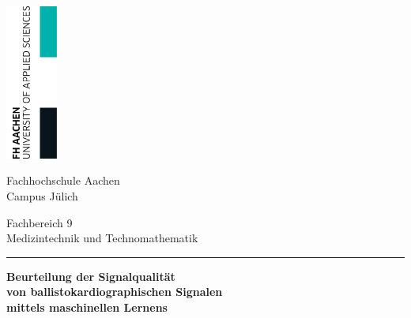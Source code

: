 \begin{titlepage}

	\thispagestyle{empty}
	

	\begin{flushright}
		\includegraphics[width=1.7cm]{./pic/FHAC.jpg}
	\end{flushright}
	
	\vspace{-3.5cm}


	\centering \begin{bfseries} \Large Fachhochschule Aachen\\
	\normalsize Campus Jülich\end{bfseries}

	\vspace{1.5cm}
	\normalsize
	Fachbereich 9\\
	Medizintechnik und Technomathematik
	
	\vspace{0.5cm}
	
	\centering \rule{0.75\textwidth}{1pt}
	
	\vspace{1cm}

	\centering \begin{minipage}[t]{17cm}
		\centering \bfseries \huge Beurteilung der Signalqualität\\von ballistokardiographischen Signalen\\mittels maschinellen Lernens\medskip
	\end{minipage}


\end{titlepage}
